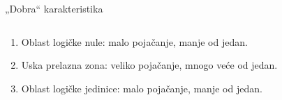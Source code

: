 \begin{frame}[label=08-s017]{„Dobra“ karakteristika}
\begin{columns}[c,onlytextwidth]
\centering
{}\centering
\end{columns}\medskip
\begin{enumerate}
\item Oblast logičke nule: malo pojačanje, manje od jedan.
\item Uska prelazna zona: veliko pojačanje, mnogo veće od jedan.
\item Oblast logičke jedinice: malo pojačanje, manje od jedan.
\end{enumerate}
\end{frame}

